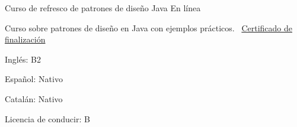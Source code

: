 \documentclass[]{awesome-cv}
\begin{document}
\begin{cventries}
    \cventry
    {}
    {Curso de refresco de patrones de diseño Java}
    {En línea}
    {}
    {\begin{cvitems}
        \item {Curso sobre patrones de diseño en Java con ejemplos prácticos.
        \newline \faLink\ \href{https://www.udemy.com/certificate/UC-982e3338-ea7d-4434-bf27-af8e38b77bd5/}{Certificado de finalización}}
    \end{cvitems}}
\end{cventries}

\begin{cventries}
    \cventry
    {}
    {}
    {}
    {}
    {\begin{cvitems}
        \item {Inglés: B2}
        \item {Español: Nativo}
        \item {Catalán: Nativo}
    \end{cvitems}}
    \cventry
    {Licencia de conducir: B}
    {}
    {}
    {}
    {}
\end{cventries}
\end{document}
